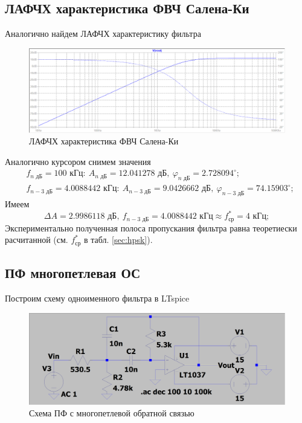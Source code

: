 \documentclass[a4paper, 12pt]{article}
\begin{document}
    \subsection{ЛАФЧХ характеристика ФВЧ Салена-Ки}
    Аналогично найдем ЛАФЧХ характеристику фильтра
    \begin{figure}[H]
        \centering
        \includegraphics[scale=0.46]{3task_lapfr.png}
        \captionsetup{skip=0pt}
        \caption{ЛАФЧХ характеристика ФВЧ Салена-Ки}
        \label{fig:3task_lapfr}
    \end{figure}
    \noindent Аналогично курсором снимем значения
    \begin{align*}
    &f_{n\text{ дБ}}=100\text{ кГц}:\ A_{n\text{ дБ}}=12.041278\text{ дБ},\ \varphi_{n\text{ дБ}}=2.728094^{\circ};\\
    &f_{n-3\text{ дБ}}=4.0088442 \text{ кГц}:\ A_{n-3\text{ дБ}}=9.0426662\text{ дБ},\ \varphi_{n-3\text{ дБ}}=74.15903^{\circ};
    \end{align*}
    Имеем
    $$
    \Delta A=2.9986118\text{ дБ},\ f_{n-3\text{ дБ}}=4.0088442\text{ кГц}\approx f_\text{ср}^*=4\text{ кГц};
    $$
    Экспериментально полученная полоса пропускания фильтра равна теоретиески расчитанной (см. $f_\text{ср}^*$ в табл. \ref{sec:hpsk}).


    \subsection{ПФ многопетлевая ОС}
    Построим схему одноименного фильтра в LTspice
    \begin{figure}[H]
        \centering
        \includegraphics[scale=0.22]{scheme4.png}
        \captionsetup{skip=0pt}
        \caption{Схема ПФ с многопетлевой обратной связью}
        \label{fig:scheme4}
    \end{figure}
\end{document}
